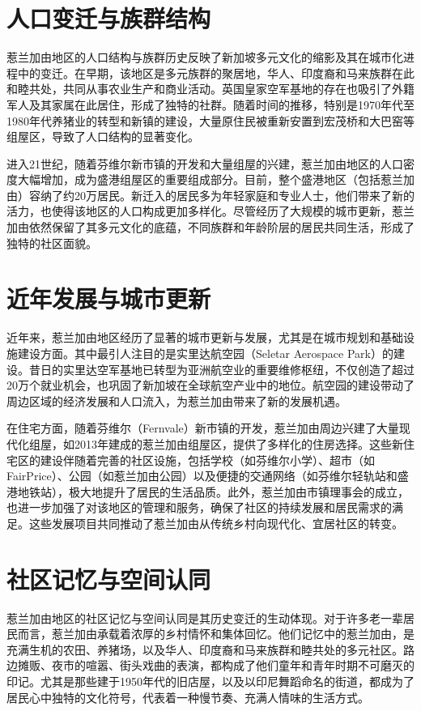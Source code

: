 \documentclass[11pt,a4paper,twoside,openany]{book}
\begin{document}
\section{人口变迁与族群结构}
惹兰加由地区的人口结构与族群历史反映了新加坡多元文化的缩影及其在城市化进程中的变迁。在早期，该地区是多元族群的聚居地，华人、印度裔和马来族群在此和睦共处，共同从事农业生产和商业活动。英国皇家空军基地的存在也吸引了外籍军人及其家属在此居住，形成了独特的社群。随着时间的推移，特别是1970年代至1980年代养猪业的转型和新镇的建设，大量原住民被重新安置到宏茂桥和大巴窑等组屋区，导致了人口结构的显著变化。

进入21世纪，随着芬维尔新市镇的开发和大量组屋的兴建，惹兰加由地区的人口密度大幅增加，成为盛港组屋区的重要组成部分。目前，整个盛港地区（包括惹兰加由）容纳了约20万居民。新迁入的居民多为年轻家庭和专业人士，他们带来了新的活力，也使得该地区的人口构成更加多样化。尽管经历了大规模的城市更新，惹兰加由依然保留了其多元文化的底蕴，不同族群和年龄阶层的居民共同生活，形成了独特的社区面貌。

\section{近年发展与城市更新}
近年来，惹兰加由地区经历了显著的城市更新与发展，尤其是在城市规划和基础设施建设方面。其中最引人注目的是实里达航空园（Seletar Aerospace Park）的建设。昔日的实里达空军基地已转型为亚洲航空业的重要维修枢纽，不仅创造了超过20万个就业机会，也巩固了新加坡在全球航空产业中的地位。航空园的建设带动了周边区域的经济发展和人口流入，为惹兰加由带来了新的发展机遇。

在住宅方面，随着芬维尔（Fernvale）新市镇的开发，惹兰加由周边兴建了大量现代化组屋，如2013年建成的惹兰加由组屋区，提供了多样化的住房选择。这些新住宅区的建设伴随着完善的社区设施，包括学校（如芬维尔小学）、超市（如FairPrice）、公园（如惹兰加由公园）以及便捷的交通网络（如芬维尔轻轨站和盛港地铁站），极大地提升了居民的生活品质。此外，惹兰加由市镇理事会的成立，也进一步加强了对该地区的管理和服务，确保了社区的持续发展和居民需求的满足。这些发展项目共同推动了惹兰加由从传统乡村向现代化、宜居社区的转变。

\section{社区记忆与空间认同}
惹兰加由地区的社区记忆与空间认同是其历史变迁的生动体现。对于许多老一辈居民而言，惹兰加由承载着浓厚的乡村情怀和集体回忆。他们记忆中的惹兰加由，是充满生机的农田、养猪场，以及华人、印度裔和马来族群和睦共处的多元社区。路边摊贩、夜市的喧嚣、街头戏曲的表演，都构成了他们童年和青年时期不可磨灭的印记。尤其是那些建于1950年代的旧店屋，以及以印尼舞蹈命名的街道，都成为了居民心中独特的文化符号，代表着一种慢节奏、充满人情味的生活方式。
\end{document}
